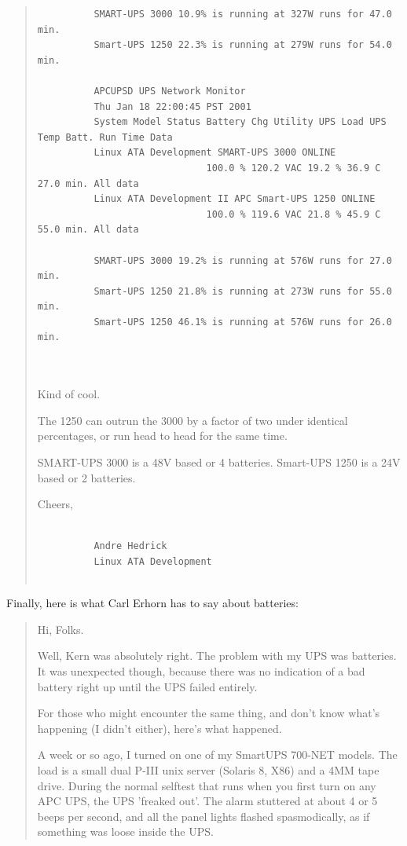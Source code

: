{{{{{{{{{\begin{quote}
\begin{verbatim}
          SMART-UPS 3000 10.9% is running at 327W runs for 47.0 min.
          Smart-UPS 1250 22.3% is running at 279W runs for 54.0 min.
          
          APCUPSD UPS Network Monitor
          Thu Jan 18 22:00:45 PST 2001
          System Model Status Battery Chg Utility UPS Load UPS Temp Batt. Run Time Data
          Linux ATA Development SMART-UPS 3000 ONLINE
                              100.0 % 120.2 VAC 19.2 % 36.9 C 27.0 min. All data
          Linux ATA Development II APC Smart-UPS 1250 ONLINE
                              100.0 % 119.6 VAC 21.8 % 45.9 C 55.0 min. All data
          
          SMART-UPS 3000 19.2% is running at 576W runs for 27.0 min.
          Smart-UPS 1250 21.8% is running at 273W runs for 55.0 min.
          Smart-UPS 1250 46.1% is running at 576W runs for 26.0 min.
          
     
\end{verbatim}
\normalsize

Kind of cool.  

The 1250 can outrun the 3000 by a factor of two under identical percentages,
or run head to head for the same time.  

SMART-UPS 3000 is a 48V based or 4 batteries.  Smart-UPS 1250 is a 24V based
or 2 batteries.  

Cheers,  

\footnotesize
\begin{verbatim}
          
          Andre Hedrick
          Linux ATA Development
     
\end{verbatim}
\normalsize

\end{quote}

Finally, here is what Carl Erhorn has to say about batteries:  

\begin{quote}

Hi, Folks.  

Well, Kern was absolutely right. The problem with my UPS was batteries. It was
unexpected though, because there was no indication of a bad battery right up
until the UPS failed entirely.  

For those who might encounter the same thing, and don't know what's happening
(I didn't either), here's what happened.  

A week or so ago, I turned on one of my SmartUPS 700-NET models. The load is a
small dual P-III unix server (Solaris 8, X86) and a 4MM tape drive. During the
normal selftest that runs when you first turn on any APC UPS, the UPS 'freaked
out'. The alarm stuttered at about 4 or 5 beeps per second, and all the panel
lights flashed spasmodically, as if something was loose inside the UPS.  


\end{quote}}}}}}}}}}
